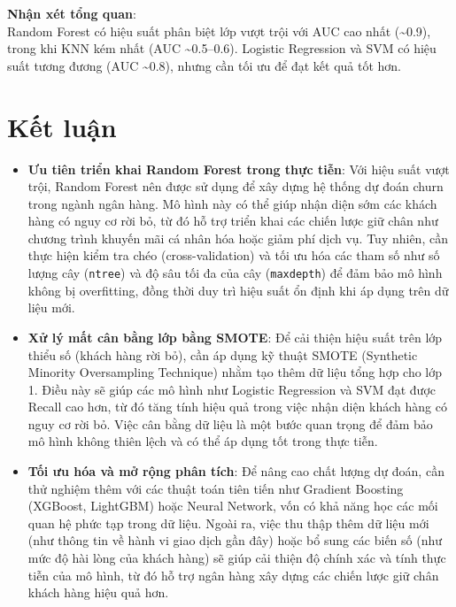 \documentclass[
]{article}
\providecommand{\tightlist}{%
  \setlength{\itemsep}{0pt}\setlength{\parskip}{0pt}}
\begin{document}
\textbf{Nhận xét tổng quan}:\\
Random Forest có hiệu suất phân biệt lớp vượt trội với AUC cao nhất
(\textasciitilde0.9), trong khi KNN kém nhất (AUC
\textasciitilde0.5--0.6). Logistic Regression và SVM có hiệu suất tương
đương (AUC \textasciitilde0.8), nhưng cần tối ưu để đạt kết quả tốt hơn.

\section{Kết luận}\label{kux1ebft-luux1eadn}

\begin{itemize}
\tightlist
\item
  \textbf{Ưu tiên triển khai Random Forest trong thực tiễn}: Với hiệu
  suất vượt trội, Random Forest nên được sử dụng để xây dựng hệ thống dự
  đoán churn trong ngành ngân hàng. Mô hình này có thể giúp nhận diện
  sớm các khách hàng có nguy cơ rời bỏ, từ đó hỗ trợ triển khai các
  chiến lược giữ chân như chương trình khuyến mãi cá nhân hóa hoặc giảm
  phí dịch vụ. Tuy nhiên, cần thực hiện kiểm tra chéo (cross-validation)
  và tối ưu hóa các tham số như số lượng cây (\texttt{ntree}) và độ sâu
  tối đa của cây (\texttt{maxdepth}) để đảm bảo mô hình không bị
  overfitting, đồng thời duy trì hiệu suất ổn định khi áp dụng trên dữ
  liệu mới.\\
\item
  \textbf{Xử lý mất cân bằng lớp bằng SMOTE}: Để cải thiện hiệu suất
  trên lớp thiểu số (khách hàng rời bỏ), cần áp dụng kỹ thuật SMOTE
  (Synthetic Minority Oversampling Technique) nhằm tạo thêm dữ liệu tổng
  hợp cho lớp 1. Điều này sẽ giúp các mô hình như Logistic Regression và
  SVM đạt được Recall cao hơn, từ đó tăng tính hiệu quả trong việc nhận
  diện khách hàng có nguy cơ rời bỏ. Việc cân bằng dữ liệu là một bước
  quan trọng để đảm bảo mô hình không thiên lệch và có thể áp dụng tốt
  trong thực tiễn.\\
\item
  \textbf{Tối ưu hóa và mở rộng phân tích}: Để nâng cao chất lượng dự
  đoán, cần thử nghiệm thêm với các thuật toán tiên tiến như Gradient
  Boosting (XGBoost, LightGBM) hoặc Neural Network, vốn có khả năng học
  các mối quan hệ phức tạp trong dữ liệu. Ngoài ra, việc thu thập thêm
  dữ liệu mới (như thông tin về hành vi giao dịch gần đây) hoặc bổ sung
  các biến số (như mức độ hài lòng của khách hàng) sẽ giúp cải thiện độ
  chính xác và tính thực tiễn của mô hình, từ đó hỗ trợ ngân hàng xây
  dựng các chiến lược giữ chân khách hàng hiệu quả hơn.
\end{itemize}
\end{document}

